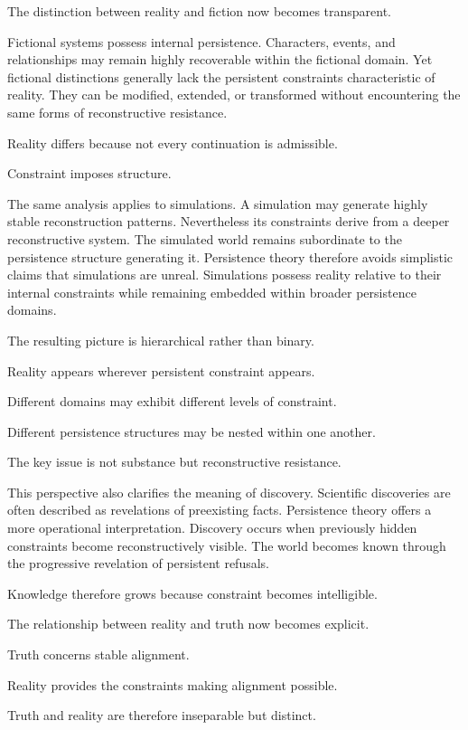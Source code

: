 \documentclass[12pt,oneside]{article}
\theoremstyle{definition}
\begin{document}
The distinction between reality and fiction now becomes transparent.

Fictional systems possess internal persistence. Characters, events, and relationships may remain highly recoverable within the fictional domain. Yet fictional distinctions generally lack the persistent constraints characteristic of reality. They can be modified, extended, or transformed without encountering the same forms of reconstructive resistance.

Reality differs because not every continuation is admissible.

Constraint imposes structure.

The same analysis applies to simulations. A simulation may generate highly stable reconstruction patterns. Nevertheless its constraints derive from a deeper reconstructive system. The simulated world remains subordinate to the persistence structure generating it. Persistence theory therefore avoids simplistic claims that simulations are unreal. Simulations possess reality relative to their internal constraints while remaining embedded within broader persistence domains.

The resulting picture is hierarchical rather than binary.

Reality appears wherever persistent constraint appears.

Different domains may exhibit different levels of constraint.

Different persistence structures may be nested within one another.

The key issue is not substance but reconstructive resistance.

This perspective also clarifies the meaning of discovery. Scientific discoveries are often described as revelations of preexisting facts. Persistence theory offers a more operational interpretation. Discovery occurs when previously hidden constraints become reconstructively visible. The world becomes known through the progressive revelation of persistent refusals.

Knowledge therefore grows because constraint becomes intelligible.

The relationship between reality and truth now becomes explicit.

Truth concerns stable alignment.

Reality provides the constraints making alignment possible.

Truth and reality are therefore inseparable but distinct.
\end{document}
